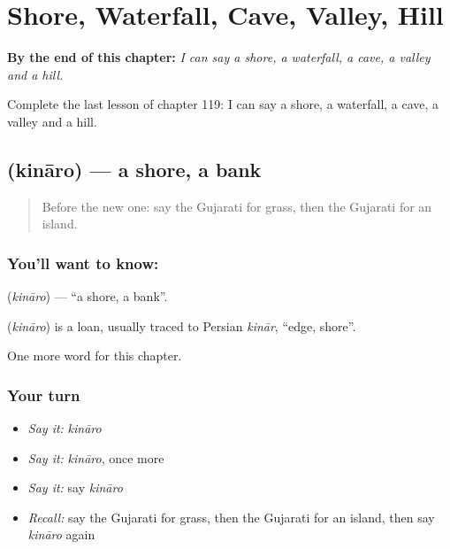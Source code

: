 
\chapter{Shore, Waterfall, Cave, Valley, Hill}
\label{ch:gu-shore-waterfall-cave-valley-hill}

\begin{chapteropening}
\textbf{By the end of this chapter:} \emph{I can say a shore, a waterfall, a cave, a valley and a hill.}

Complete the last lesson of chapter 119: I can say a shore, a waterfall, a cave, a valley and a hill.
\end{chapteropening}

\section[\texorpdfstring{\gu{કિનારો} (kināro)}{કિનારો (kināro)}]{ (kināro) — a shore, a bank}

\label{lesson:GU-C119-kinaro}



\begin{quote}
Before the new one: say the Gujarati for grass, then the Gujarati for an island.
\end{quote}

\subsection*{You'll want to know: }
\textbf{} (\emph{kināro}) — \textquotedblleft{}a shore, a bank\textquotedblright{}.

\begin{cousinweb}
\textbf{} (\emph{kināro}) is a loan, usually traced to Persian \emph{kinār}, \textquotedblleft{}edge, shore\textquotedblright{}.
\end{cousinweb}

\begin{grammarlens}[title={What you've built}]
One more word for this chapter.
\end{grammarlens}

\subsection*{Your turn}
\begin{itemize}
\raggedright
  \item \emph{Say it:} \emph{kināro}
  \item \emph{Say it:} \emph{kināro}, once more
  \item \emph{Say it:} say \emph{kināro}
  \item \emph{Recall:} say the Gujarati for grass, then the Gujarati for an island, then say \emph{kināro} again
\end{itemize}


